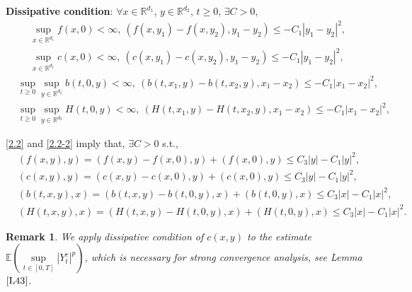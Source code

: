\documentclass[11pt,reqno]{amsart}
\newtheorem{remark}{\indent Remark}[section]
\numberwithin{equation}{section}
\begin{document}
\noindent\textbf{Dissipative condition}: $\forall x\in \mathbb{R}^{d_{1}}$, $y\in \mathbb{R}^{d_{2}}$,  $t\geq0$, $\exists C>0$,
\begin{equation}\label{2.2}
	\begin{split}
		& \sup_{x\in \mathbb{R}^{d_{1}}}f(x,0)<\infty, \ ( f(x,y_{1})-f(x,y_{2}), y_{1}-y_{2})  \leq -C_{1}|y_{1}-y_{2}|^{2},\\
		& \sup_{x\in \mathbb{R}^{d_{1}}}c(x,0)<\infty, \ ( c(x,y_{1})-c(x,y_{2}), y_{1}-y_{2})  \leq -C_{1}|y_{1}-y_{2}|^{2},
			\end{split}
	\end{equation}
		\begin{equation}\label{2.2-2}
			\begin{split}
		& \sup_{t\geq0}\sup_{y\in \mathbb{R}^{d_{2}}}b(t,0,y)<\infty, \ ( b(t,x_{1},y)-b(t,x_{2},y), x_{1}-x_{2})  \leq -C_{1}|x_{1}-x_{2}|^{2},\\
		& \sup_{t\geq0}\sup_{y\in \mathbb{R}^{d_{2}}}H(t,0,y)<\infty, \ ( H(t,x_{1},y)-H(t,x_{2},y), x_{1}-x_{2}) \leq -C_{1}|x_{1}-x_{2}|^{2},
	\end{split}
\end{equation}

\eqref{2.2} and \eqref{2.2-2} imply that, $\exists C>0$ s.t.,
\begin{equation}\label{2.4}
	\begin{split}
		&( f(x,y),y )=( f(x,y)-f(x,0), y ) + (f(x,0),y)  \leq C_{3}|y|-C_{1}|y|^{2},\\
		&( c(x,y),y )=( c(x,y)-c(x,0), y ) +( c(x,0),y ) \leq C_{3}|y|-C_{1}|y|^{2},\\
		& (b(t,x,y),x) = (b(t,x,y)-b(t,0,y), x ) + (b(t,0,y),x)  \leq C_{3}|x|-C_{1}|x|^{2},\\
		& (H(t,x,y),x) = (H(t,x,y)-H(t,0,y), x) + (H(t,0,y),x)  \leq C_{3}|x|-C_{1}|x|^{2}.
	\end{split}
\end{equation}		



\begin{remark}
We apply dissipative condition  of $c(x,y)$ to the estimate $\mathbb{E}(\underset{t\in [0,T]}{\sup} |Y_{t}^{\varepsilon}|^{p})$, which is necessary for strong convergence analysis, see Lemma $\ref{L43}$.
\end{remark}
\end{document}
